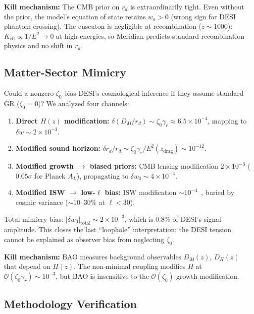 \textbf{Kill mechanism:} The CMB prior on $r_d$ is extraordinarily tight. Even without the prior, the model's equation of state retains $w_a > 0$ (wrong sign for DESI phantom crossing). The cuscuton is negligible at recombination ($z \sim 1000$): $K_{\mathrm{eff}} \propto 1/E^2 \to 0$ at high energies, so Meridian predicts standard recombination physics and no shift in $r_d$.

\subsection{Matter-Sector Mimicry}
\label{sec:3-mimicry}

Could a nonzero $\zeta_0$ bias DESI's cosmological inference if they assume standard GR ($\zeta_0 = 0$)? We analyzed four channels:

\begin{enumerate}
  \item \textbf{Direct $H(z)$ modification:} $\delta(D_M/r_d) \sim \zeta_0 \gamma_r \approx 6.5 \times 10^{-4}$, mapping to $\delta w \sim 2 \times 10^{-3}$.
  \item \textbf{Modified sound horizon:} $\delta r_d / r_d \sim \zeta_0 \gamma_r / E^2(z_{\mathrm{drag}}) \sim 10^{-12}$.
  \item \textbf{Modified growth $\to$ biased priors:} CMB lensing modification $2 \times 10^{-3}$ ($0.05\sigma$ for Planck $A_L$), propagating to $\delta w_0 \sim 4 \times 10^{-4}$.
  \item \textbf{Modified ISW $\to$ low-$\ell$ bias:} ISW modification ${\sim}10^{-4}$~\cite{ch3:hubble2024}, buried by cosmic variance (${\sim}10$--$30\%$ at $\ell < 30$).
\end{enumerate}

Total mimicry bias: $|\delta w_0|_{\mathrm{total}} \sim 2 \times 10^{-3}$, which is 0.8\% of DESI's signal amplitude. This closes the last ``loophole'' interpretation: the DESI tension cannot be explained as observer bias from neglecting $\zeta_0$.

\textbf{Kill mechanism:} BAO measures background observables $D_M(z)$, $D_H(z)$ that depend on $H(z)$. The non-minimal coupling modifies $H$ at $\mathcal{O}(\zeta_0 \gamma_r) \sim 10^{-3}$, but BAO is insensitive to the $\mathcal{O}(\zeta_0)$ growth modification.

\subsection{Methodology Verification}
\label{sec:3-methodology}


